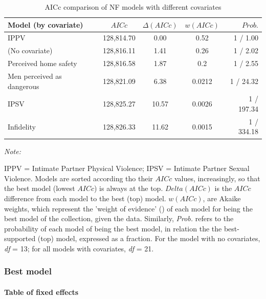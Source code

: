 \documentclass[
  bookmarksnumbered]{article}
\begin{document}
\begin{table}[H]
\centering
\caption{\label{tab:comp-m3}AICc comparison of NF models with different covariates}
\centering
\begin{threeparttable}
\begin{tabular}[t]{lcccr}
\toprule
Model (by covariate) & $AICc$ & $\Delta(AICc)$ & $w(AICc)$ & $Prob.$\\
\midrule
IPPV & 128,814.70 & 0.00 & 0.52 & 1 / 1.00\\
(No covariate) & 128,816.11 & 1.41 & 0.26 & 1 / 2.02\\
Perceived home safety & 128,816.58 & 1.87 & 0.2 & 1 / 2.55\\
Men perceived as dangerous & 128,821.09 & 6.38 & 0.0212 & 1 / 24.32\\
IPSV & 128,825.27 & 10.57 & 0.0026 & 1 / 197.34\\
Infidelity & 128,826.33 & 11.62 & 0.0015 & 1 / 334.18\\
\bottomrule
\end{tabular}
\begin{tablenotes}[para]
\item \textit{Note: } 
\item IPPV = Intimate Partner Physical Violence; 
             IPSV = Intimate Partner Sexual Violence.
             Models are sorted according tho their $AICc$ values, increasingly, 
             so that the best model (lowest $AICc$) is always at the top. 
             $Delta(AICc)$ is the $AICc$ difference from each model to the best (top) model. 
             $w(AICc)$, are Akaike weights, which represent the 'weight of evidence'
             (\cite{portetPrimerModelSelection2020}) of each model for being the best model 
             of the collection, given the data. 
             Similarly, \textit{Prob.} refers to the probability of each model of being the 
             best model, in relation the the best-supported (top) model, expressed as a 
             fraction. For the model with no covariates, \textit{df} = 13; for all models 
             with covariates, \textit{df} = 21.
\end{tablenotes}
\end{threeparttable}
\end{table}

\subsubsection{Best model}\label{best-model-2}

\paragraph{Table of fixed effects}\label{table-of-fixed-effects-6}
\end{document}
